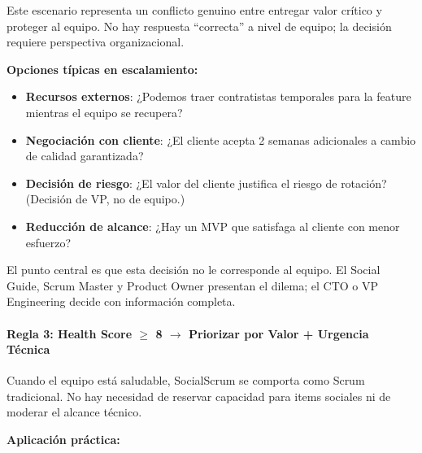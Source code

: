 Este escenario representa un conflicto genuino entre entregar valor crítico y proteger al equipo. No hay respuesta ``correcta'' a nivel de equipo; la decisión requiere perspectiva organizacional.

\textbf{Opciones típicas en escalamiento:}

\begin{itemize}
    \item \textbf{Recursos externos}: ¿Podemos traer contratistas temporales para la feature mientras el equipo se recupera?
    \item \textbf{Negociación con cliente}: ¿El cliente acepta 2 semanas adicionales a cambio de calidad garantizada?
    \item \textbf{Decisión de riesgo}: ¿El valor del cliente justifica el riesgo de rotación? (Decisión de VP, no de equipo.)
    \item \textbf{Reducción de alcance}: ¿Hay un MVP que satisfaga al cliente con menor esfuerzo?
\end{itemize}

El punto central es que esta decisión no le corresponde al equipo. El Social Guide, Scrum Master y Product Owner presentan el dilema; el CTO o VP Engineering decide con información completa.

\paragraph{Regla 3: Health Score $\geq$ 8 $\rightarrow$ Priorizar por Valor + Urgencia Técnica}

Cuando el equipo está saludable, SocialScrum se comporta como Scrum tradicional. No hay necesidad de reservar capacidad para items sociales ni de moderar el alcance técnico.

\textbf{Aplicación práctica:}

